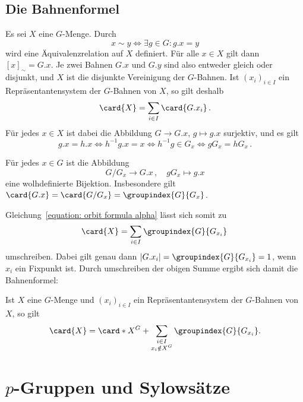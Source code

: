 \subsection{Die Bahnenformel}

Es sei $X$ eine $G$-Menge.
Durch
\[
        x \sim y
  \iff  \exists g \in G: g.x = y
\]
wird eine Äquivalenzrelation auf $X$ definiert.
Für alle $x \in X$ gilt dann $[x]_{\sim} = G.x$.
Je zwei Bahnen $G.x$ und $G.y$ sind also entweder gleich oder disjunkt, und $X$ ist die disjunkte Vereinigung der $G$-Bahnen.
Ist $(x_i)_{i \in I}$ ein Repräsentantensystem der $G$-Bahnen von $X$, so gilt deshalb
\begin{equation}
\label{equation: orbit formula alpha}
    \card{X}
  = \sum_{i \in I} \card{G.x_i} \,.
\end{equation}
Für jedes $x \in X$ ist dabei die Abbildung $G \to G.x$, $g \mapsto g.x$ surjektiv, und es gilt
\[
        g.x = h.x
  \iff  h^{-1}g.x = x
  \iff  h^{-1} g \in G_x
  \iff  g G_x = h G_x \,.
\]

\begin{lemma}
  Für jedes $x \in G$ ist die Abbildung
  \[
            G/G_x
    \to     G.x \,,
    \quad   g G_x
    \mapsto g.x
  \]
  eine wolhdefinierte Bijektion.
  Insbesondere gilt $\card{G.x} = \card{G/G_x} = \groupindex{G}{G_x}$.
\end{lemma}

Gleichung~\eqref{equation: orbit formula alpha} lässt sich somit zu
\[
    \card{X}
  = \sum_{i \in I} \groupindex{G}{G_{x_i}} \,
\]
umschreiben.
Dabei gilt genau dann $|G.x_i| = \groupindex{G}{G_{x_i}} = 1$, wenn $x_i$ ein Fixpunkt ist.
Durch umschreiben der obigen Summe ergibt sich damit die Bahnenformel:

\begin{corollary}[Bahnenformel]
  Ist $X$ eine $G$-Menge und $(x_i)_{i \in I}$ ein Repräsentantensystem der $G$-Bahnen von $X$, so gilt
  \[
      \card{X}
    =   \card*{X^G}
      + \sum_{\substack{i \in I \\ x_i \notin X^G}} \groupindex{G}{G_{x_i}}.
  \]

\end{corollary}





\section{\texorpdfstring{$p$}{p}-Gruppen und Sylowsätze}

